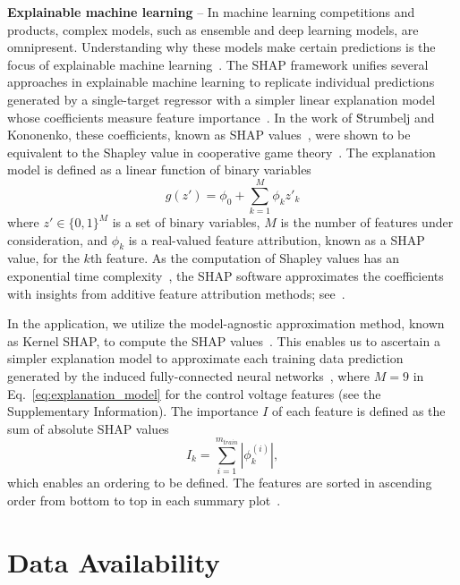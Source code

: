 \documentclass[aps,twocolumn,superscriptaddress,floatfix,preprintnumbers,showkeys]{revtex4}
\begin{document}
\textbf{Explainable machine learning} -- In machine learning competitions and products, complex models, such as ensemble and deep learning models, are omnipresent. Understanding why these models make certain predictions is the focus of explainable machine learning~\cite{Lundberg_2017, Molnar_2020}. The SHAP framework unifies several approaches in explainable machine learning to replicate individual predictions generated by a single-target regressor with a simpler linear explanation model whose coefficients measure feature importance~\cite{Lundberg_2017}. In the work of \u{S}trumbelj and Kononenko, these coefficients, known as SHAP values~\cite{Lundberg_2017}, were shown to be equivalent to the Shapley value in cooperative game theory~\cite{Strumbelj_2014}. The explanation model is defined as a linear function of binary variables
\begin{equation}
\label{eq:explanation_model}
g(z') = \phi_{0} + \sum_{k=1}^{M} \phi_{k} z'_{k}
\end{equation}
where $z' \in \{ 0, 1\}^{M}$ is a set of binary variables, $M$ is the number of features under consideration, and $\phi_{k}$ is a real-valued feature attribution, known as a SHAP value, for the $k$th feature. As the computation of Shapley values has an exponential time complexity~\cite{Strumbelj_2014}, the SHAP software approximates the coefficients with insights from additive feature attribution methods; see~\cite{Lundberg_2017}. 

In the application, we utilize the model-agnostic approximation method, known as Kernel SHAP, to compute the SHAP values~\cite{Lundberg_2017}. This enables us to ascertain a simpler explanation model to approximate each training data prediction generated by the induced fully-connected neural networks~\cite{Sklearn_2011}, where $M=9$ in Eq.~\ref{eq:explanation_model} for the control voltage features (see the Supplementary Information). The importance $I$ of each feature is defined as the sum of absolute SHAP values 
\begin{equation}
\label{eq:feature_importance}
I_{k} = \sum_{i=1}^{m_{train}} |\phi_{k}^{(i)}|,
\end{equation}
which enables an ordering to be defined. The features are sorted in ascending order from bottom to top in each summary plot~\cite{Lundberg_2017, Molnar_2020}.

\section*{Data Availability}
\end{document}
